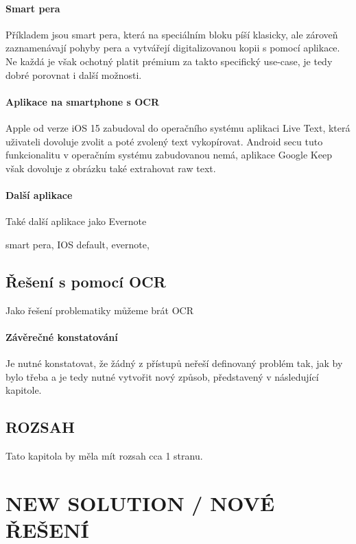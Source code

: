 \documentclass[journal]{IEEEtran}
\begin{document}
\paragraph{Smart pera}
Příkladem jsou smart pera, která na speciálním bloku píší klasicky, ale zároveň zaznamenávají pohyby pera a vytvářejí digitalizovanou kopii s pomocí aplikace. Ne každá je však ochotný platit prémium za takto specifický use-case, je tedy dobré porovnat i další možnosti.\cite{popupalr_science_digitalization_with_pens}

\paragraph{Aplikace na smartphone s OCR}
Apple od verze iOS 15 zabudoval do operačního systému aplikaci Live Text, která uživateli dovoluje zvolit a poté zvolený text vykopírovat. Android secu tuto funkcionalitu v operačním systému zabudovanou nemá, aplikace Google Keep však dovoluje z obrázku také extrahovat raw text.\cite{aarp_digitalization, google_keep}

\paragraph{Další aplikace}
Také další aplikace jako Evernote

smart pera,
IOS default,
evernote,


\subsection{Řešení s pomocí OCR}
Jako řešení problematiky můžeme brát \ac{OCR}


\paragraph{Závěrečné konstatování}
Je nutné konstatovat, že žádný z přístupů neřeší definovaný problém tak, jak by bylo třeba a je tedy nutné vytvořit nový způsob, představený v následující kapitole.


\subsection{ROZSAH}
Tato kapitola by měla mít rozsah cca 1 stranu.



\section{NEW SOLUTION / NOVÉ ŘEŠENÍ}
\end{document}
